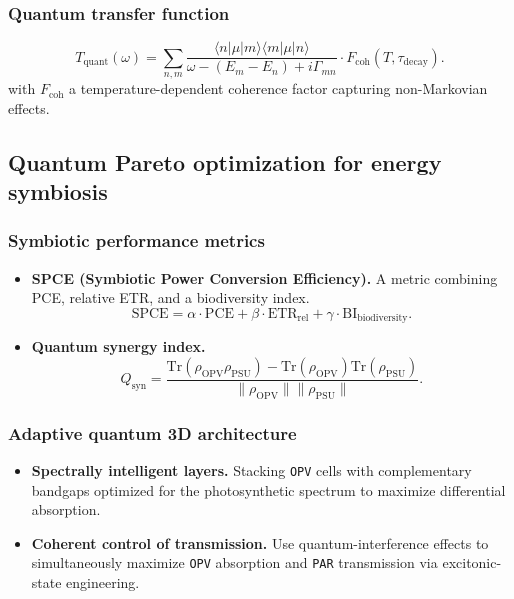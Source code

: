 \documentclass[12pt, a4paper]{article}
\begin{document}
\subsubsection{Quantum transfer function}

\begin{equation}
T_{\text{quant}}(\omega) = \sum_{n,m} \frac{\langle n | \mu | m \rangle \langle m | \mu | n \rangle}{\omega - (E_m - E_n) + i\Gamma_{mn}} \cdot F_{\text{coh}}(T, \tau_{\text{decay}}).
\end{equation}
with $F_{\text{coh}}$ a temperature-dependent coherence factor capturing non-Markovian effects.

\subsection{Quantum Pareto optimization for energy symbiosis}

\subsubsection{Symbiotic performance metrics}

\begin{itemize}
    \item \textbf{SPCE (Symbiotic Power Conversion Efficiency).} A metric combining PCE, relative ETR, and a biodiversity index.
    \begin{equation}
    \text{SPCE} = \alpha \cdot \text{PCE} + \beta \cdot \text{ETR}_{\text{rel}} + \gamma \cdot \text{BI}_{\text{biodiversity}}.
    \end{equation}
    
    \item \textbf{Quantum synergy index.}
    \begin{equation}
    Q_{\text{syn}} = \frac{\text{Tr}(\rho_{\text{OPV}}\rho_{\text{PSU}}) - \text{Tr}(\rho_{\text{OPV}})\text{Tr}(\rho_{\text{PSU}})}{\|\rho_{\text{OPV}}\| \|\rho_{\text{PSU}}\|}.
    \end{equation}
\end{itemize}

\subsubsection{Adaptive quantum 3D architecture}

\begin{itemize}
    \item \textbf{Spectrally intelligent layers.} Stacking \texttt{OPV} cells with complementary bandgaps optimized for the photosynthetic spectrum to maximize differential absorption.
    
    \item \textbf{Coherent control of transmission.} Use quantum-interference effects to simultaneously maximize \texttt{OPV} absorption and \texttt{PAR} transmission via excitonic-state engineering.
\end{itemize}
\end{document}
